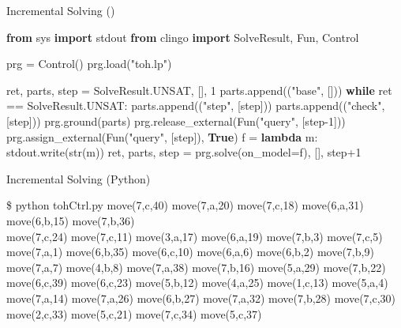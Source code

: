 \begin{frame}[fragile]{Incremental Solving ()}
  \small
  \begin{semiverbatim}
{\bf{}from} sys {\bf{}import} stdout
{\bf{}from} clingo {\bf{}import} SolveResult, Fun, Control

\alert<3>{prg = Control()}
\alert<3>{prg.load("toh.lp")}

ret, parts, step = SolveResult.UNSAT, [], 1
parts.append(("base", []))
{\bf{}while} ret == SolveResult.UNSAT:
    parts.append(("step", [step]))
    parts.append(("check", [step]))
    prg.ground(parts)
    prg.release_external(Fun("query", [step-1]))
    prg.assign_external(Fun("query", [step]), {\bf{}True})
    \alert<4,5>{f = {\bf{}lambda} m: stdout.write(str(m))}
    ret, parts, step = prg.solve(\alert<5>{on_model=f}), [], step+1
  \end{semiverbatim}
\end{frame}
\begin{frame}[fragile]{Incremental Solving (Python)}
\scriptsize
\begin{semiverbatim}
\$ python tohCtrl.py \pause
move(7,c,40) move(7,a,20) move(7,c,18) move(6,a,31) move(6,b,15) move(7,b,36) \\
move(7,c,24) move(7,c,11) move(3,a,17) move(6,a,19) move(7,b,3)  move(7,c,5)  \\
move(7,a,1)  move(6,b,35) move(6,c,10) move(6,a,6)  move(6,b,2)  move(7,b,9)  \\
move(7,a,7)  move(4,b,8)  move(7,a,38) move(7,b,16) move(5,a,29) move(7,b,22) \\
move(6,c,39) move(6,c,23) move(5,b,12) move(4,a,25) move(1,c,13) move(5,a,4)  \\
move(7,a,14) move(7,a,26) move(6,b,27) move(7,a,32) move(7,b,28) move(7,c,30) \\
move(2,c,33) move(5,c,21) move(7,c,34) move(5,c,37)
\end{semiverbatim}
\end{frame}
%
